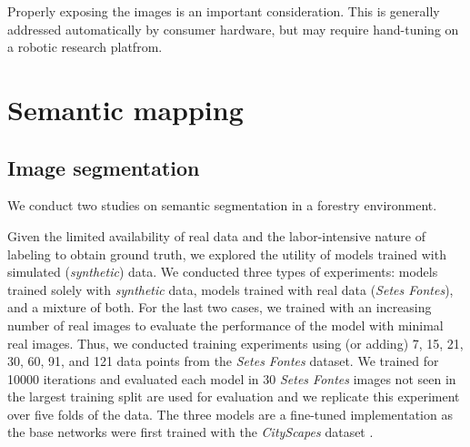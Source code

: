 Properly exposing the images is an important consideration. This is generally addressed automatically by consumer hardware, but may require hand-tuning on a robotic research platfrom.

\section{Semantic mapping}



\subsection{Image segmentation}
We conduct two studies on semantic segmentation in a forestry environment.

Given the limited availability of real data and the labor-intensive nature of labeling to obtain ground truth, we explored the utility of models trained with simulated (\textit{synthetic}) data. We conducted three types of experiments: models trained solely with \textit{synthetic} data, models trained with real data (\textit{Setes Fontes}), and a mixture of both. For the last two cases, we trained with an increasing number of real images to evaluate the performance of the model with minimal real images. Thus, we conducted training experiments using (or adding) 7, 15, 21, 30, 60, 91, and 121 data points from the \textit{Setes Fontes} dataset. We trained for 10000 iterations and evaluated each model in 30 \textit{Setes Fontes} images not seen in the largest training split are used for evaluation and we replicate this experiment over five folds of the data. The three models are a fine-tuned implementation as the base networks were first trained with the \textit{CityScapes} dataset \cite{Cordts2016}.

